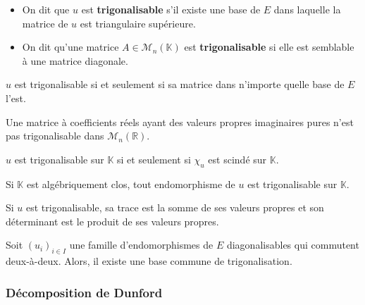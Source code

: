 
	\begin{definition}
		\begin{itemize}
			\item On dit que $u$ est \textbf{trigonalisable} s'il existe une base de $E$ dans laquelle la matrice de $u$ est triangulaire supérieure.
			\item On dit qu'une matrice $A \in \mathcal{M}_n(\mathbb{K})$ est \textbf{trigonalisable} si elle est semblable à une matrice diagonale.
		\end{itemize}
	\end{definition}

	\begin{remark}
		$u$ est trigonalisable si et seulement si sa matrice dans n'importe quelle base de $E$ l'est.
	\end{remark}

	\begin{example}
		Une matrice à coefficients réels ayant des valeurs propres imaginaires pures n'est pas trigonalisable dans $\mathcal{M}_n(\mathbb{R})$.
	\end{example}

	\begin{theorem}
		$u$ est trigonalisable sur $\mathbb{K}$ si et seulement si $\chi_u$ est scindé sur $\mathbb{K}$.
	\end{theorem}

	\begin{corollary}
		Si $\mathbb{K}$ est algébriquement clos, tout endomorphisme de $u$ est trigonalisable sur $\mathbb{K}$.
	\end{corollary}

	\begin{proposition}
		Si $u$ est trigonalisable, sa trace est la somme de ses valeurs propres et son déterminant est le produit de ses valeurs propres.
	\end{proposition}

	\begin{theorem}
		Soit $(u_i)_{i \in I}$ une famille d'endomorphismes de $E$ diagonalisables qui commutent deux-à-deux. Alors, il existe une base commune de trigonalisation.
	\end{theorem}

	\subsubsection{Décomposition de Dunford}

